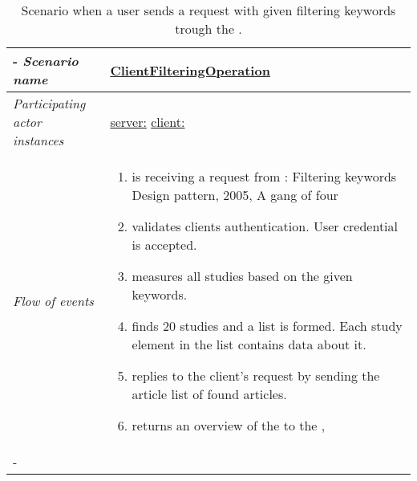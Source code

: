 %
%
\begin{table}[h!]
	\tabulinesep=1.5mm
	\begin{tabu} to 
		\tabucline[1.5pt]-
		\textit{Scenario name} & \underline{ClientFilteringOperation} \\
		\hline
		\textit{Participating actor 
			\newline instances} & \underline{server:\serverside}
		\newline \underline{client:\clientside} \\
		\hline
		\textit{Flow of events} &
		\vspace{-3mm}
		\begin{enumerate}[leftmargin=*,topsep=0pt,itemsep=-1ex]
			\item \serverside is receiving a request from \clientside: Filtering keywords {Design pattern, 2005, A gang of four}
			
			\item \serverside validates clients authentication. User credential is accepted.
			
			\item \serverside measures all studies based on the given keywords.
			
			\item \serverside finds 20 studies and a list is formed. Each study element in the list contains data about it.
			
			\item \serverside replies to the client's request by sending the article list of found articles.
			
			\item \serverside returns an overview of the \studyconfig to the \clientside, 
		\end{enumerate} \\
		\tabucline[1.5pt]-
	\end{tabu}
	\caption{Scenario when a user sends a request with given filtering keywords trough the \clientside.}
	\label{sc:ClientFilteringOperation}
\end{table}




